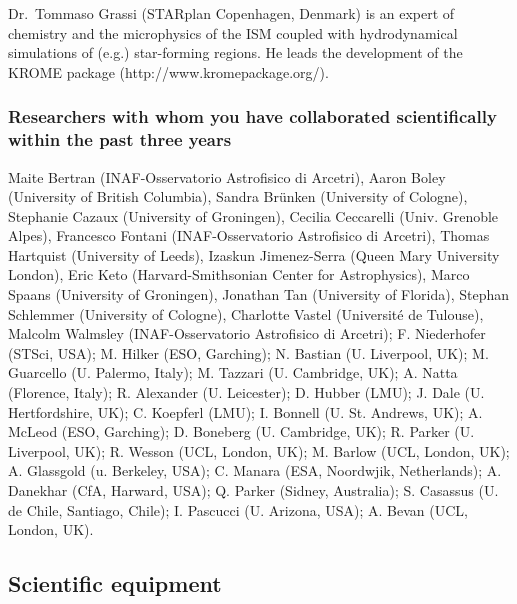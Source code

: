 \documentclass[10pt,fleqn,twoside]{article}
\begin{document}
Dr.\ Tommaso Grassi (STARplan Copenhagen, Denmark) is an expert of
chemistry and the microphysics of the ISM coupled with hydrodynamical
simulations of (e.g.) star-forming regions. He leads the development of the
KROME package (http://www.kromepackage.org/).  

\subsubsection{Researchers with whom you have collaborated scientifically within the past three years}

Maite Bertran (INAF-Osservatorio Astrofisico di Arcetri), Aaron Boley (University of British Columbia), Sandra Brünken (University of Cologne), Stephanie Cazaux (University of Groningen), Cecilia Ceccarelli (Univ. Grenoble Alpes), Francesco Fontani (INAF-Osservatorio Astrofisico di Arcetri), Thomas Hartquist (University of Leeds), Izaskun Jimenez-Serra (Queen Mary University London), Eric Keto (Harvard-Smithsonian Center for Astrophysics), Marco Spaans (University of Groningen), Jonathan Tan (University of Florida), Stephan Schlemmer (University of Cologne), Charlotte Vastel (Université de Tulouse), Malcolm Walmsley (INAF-Osservatorio Astrofisico di Arcetri);
F. Niederhofer (STSci, USA); M. Hilker (ESO, Garching); N. Bastian (U. Liverpool,
UK); M. Guarcello (U. Palermo, Italy); M. Tazzari (U. Cambridge, UK);
A. Natta (Florence, Italy); R. Alexander (U. Leicester); D. Hubber
(LMU); J. Dale (U. Hertfordshire, UK); C. Koepferl (LMU); I. Bonnell
(U. St. Andrews, UK); A. McLeod (ESO, Garching); D. Boneberg
(U. Cambridge, UK); R. Parker (U. Liverpool, UK); R. Wesson (UCL,
London, UK); M. Barlow (UCL, London, UK); A. Glassgold (u. Berkeley,
USA); C. Manara (ESA, Noordwjik, Netherlands); A. Danekhar (CfA,
Harward, USA); Q. Parker (Sidney, Australia); S. Casassus
(U. de Chile, Santiago, Chile); I. Pascucci (U. Arizona, USA);
A. Bevan (UCL, London, UK).

\subsection{Scientific equipment}
\end{document}
